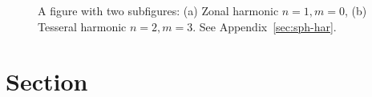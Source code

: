 \begin{figure}[t]
\begin{subfigure}[c]{0.495\textwidth}
%
\subcaption{\label{fig:zonal}}
\end{subfigure}
\begin{subfigure}[c]{0.495\textwidth}
%
\subcaption{\label{fig:tesseral}}%
\end{subfigure}%
\caption{A figure with two subfigures: (a) Zonal harmonic $n=1, m=0$, (b) Tesseral harmonic $n=2, m=3$. See Appendix~\ref{sec:sph-har}.\label{fig:1}}
\end{figure}

\lipsum[5-8]
\section{Section}
\lipsum[9-12]

